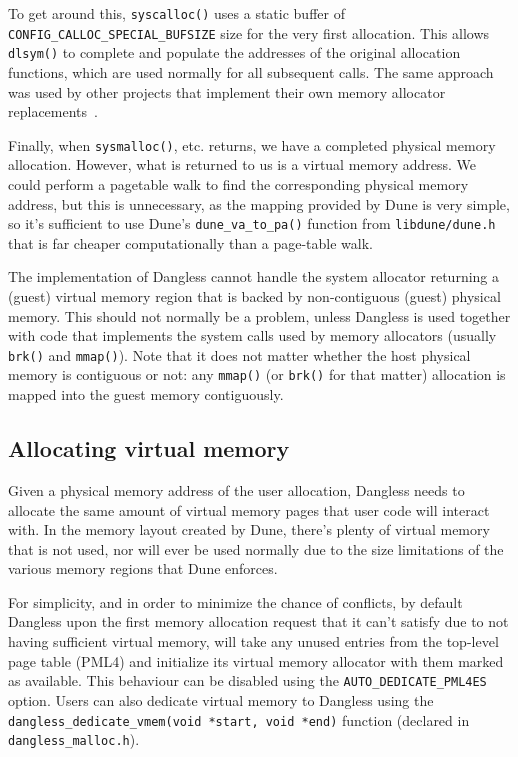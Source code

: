 To get around this, \lstinline!syscalloc()! uses a static buffer of \lstinline!CONFIG_CALLOC_SPECIAL_BUFSIZE! size for the very first allocation. This allows \lstinline!dlsym()! to complete and populate the addresses of the original allocation functions, which are used normally for all subsequent calls. The same approach was used by other projects that implement their own memory allocator replacements~\cite{dlsym-calloc-special-ex1}.

Finally, when \lstinline!sysmalloc()!, etc. returns, we have a completed physical memory allocation. However, what is returned to us is a virtual memory address. We could perform a pagetable walk to find the corresponding physical memory address, but this is unnecessary, as the mapping provided by Dune is very simple, so it's sufficient to use Dune's \lstinline!dune_va_to_pa()! function from \texttt{libdune/dune.h} that is far cheaper computationally than a page-table walk.

The implementation of Dangless cannot handle the system allocator returning a (guest) virtual memory region that is backed by non-contiguous (guest) physical memory. This should not normally be a problem, unless Dangless is used together with code that implements the system calls used by memory allocators (usually \lstinline!brk()! and \lstinline!mmap()!).
Note that it does not matter whether the host physical memory is contiguous or not: any \lstinline!mmap()! (or \lstinline!brk()! for that matter) allocation is mapped into the guest memory contiguously. 

\subsection{Allocating virtual memory}
\label{sec:dangless-alloc-virtmem}

Given a physical memory address of the user allocation, Dangless needs to allocate the same amount of virtual memory pages that user code will interact with. In the memory layout created by Dune, there's plenty of virtual memory that is not used, nor will ever be used normally due to the size limitations of the various memory regions that Dune enforces.

For simplicity, and in order to minimize the chance of conflicts, by default Dangless upon the first memory allocation request that it can't satisfy due to not having sufficient virtual memory, will take any unused entries from the top-level page table (PML4)  and initialize its virtual memory allocator with them marked as available. This behaviour can be disabled using the \lstinline!AUTO_DEDICATE_PML4ES! option. Users can also dedicate virtual memory to Dangless using the \lstinline!dangless_dedicate_vmem(void *start, void *end)! function (declared in \texttt{dangless\_malloc.h}).

